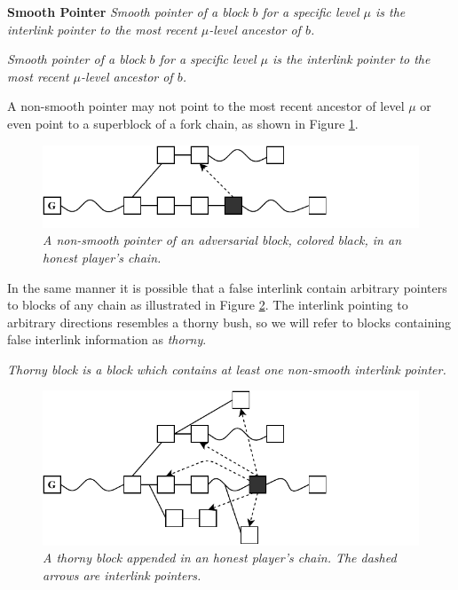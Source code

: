 \begin{defn}{\textbf{Smooth Pointer}}
    \textit{Smooth pointer of a block $b$ for a specific level $\mu$ is the
    interlink pointer to the most recent $\mu$-level ancestor of $b$.}
\begin{definition}
    \textit{Smooth pointer of a block $b$ for a specific level $\mu$ is the     interlink pointer to the most recent $\mu$-level ancestor of $b$.}
	\label{defn:smooth_pointer}
\end{definition}


A non-smooth pointer may not point to the most recent ancestor of level $\mu$ or even point to a superblock of a fork chain, as shown in Figure \ref{fig:false_interlink}.

\begin{figure}[h]
	\begin{center}
		\includegraphics[scale=0.7]{figures/false_interlink.pdf}
	\end{center}
    \caption{\textit{A non-smooth pointer of an adversarial block, colored
    black, in an honest player's chain.}}
	\label{fig:false_interlink}
\end{figure}

In the same manner it is possible that a false interlink contain arbitrary pointers to blocks of any chain as illustrated in Figure \ref{fig:thorny_block}. The interlink pointing to arbitrary directions resembles a thorny bush, so we will refer to blocks containing false interlink information as \emph{thorny}. 

\begin{definition}
	\textit{Thorny block is a block which contains at least one non-smooth interlink pointer.}
	\label{defn:thorny_block}
\end{definition}

\begin{figure}[h]
	\begin{center}
		\includegraphics[scale=0.75]{figures/thorny_block.pdf}
	\end{center}
	\caption{\textit{A thorny block appended in an honest player's chain. The dashed arrows
	are interlink pointers.}}
	\label{fig:thorny_block}
\end{figure}


\end{defn}
